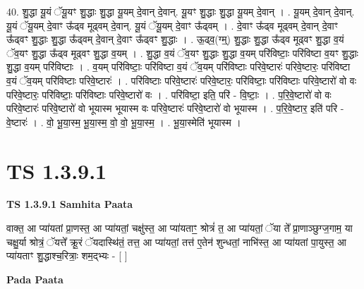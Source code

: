 \documentclass[17pt]{extarticle}
\begin{document}
40. शु॒द्धा यू॒यं ॅयू॒यꣳ शु॒द्धाः शु॒द्धा यू॒यम् दे॒वान् दे॒वान्. यू॒यꣳ शु॒द्धाः शु॒द्धा यू॒यम् दे॒वान् । . यू॒यम् दे॒वान् दे॒वान्. यू॒यं ॅयू॒यम् दे॒वाꣳ ऊ᳚ढ्व मूढ्वम् दे॒वान्. यू॒यं ॅयू॒यम् दे॒वाꣳ ऊ᳚ढ्वम् । . दे॒वाꣳ ऊ᳚ढ्व मूढ्वम् दे॒वान् दे॒वाꣳ ऊ᳚ढ्वꣳ शु॒द्धाः शु॒द्धा ऊ᳚ढ्वम् दे॒वान् दे॒वाꣳ ऊ᳚ढ्वꣳ शु॒द्धाः । . ऊ॒ढ्व॒(ग्म्॒) शु॒द्धाः शु॒द्धा ऊ᳚ढ्व मूढ्वꣳ शु॒द्धा व॒यं ॅव॒यꣳ शु॒द्धा ऊ᳚ढ्व मूढ्वꣳ शु॒द्धा व॒यम् । . शु॒द्धा व॒यं ॅव॒यꣳ शु॒द्धाः शु॒द्धा व॒यम् परि॑विष्टाः॒ परि॑विष्टा व॒यꣳ शु॒द्धाः शु॒द्धा व॒यम् परि॑विष्टाः । . व॒यम् परि॑विष्टाः॒ परि॑विष्टा व॒यं ॅव॒यम् परि॑विष्टाः परिवे॒ष्टारः॑ परिवे॒ष्टारः॒ परि॑विष्टा व॒यं ॅव॒यम् परि॑विष्टाः परिवे॒ष्टारः॑ । . परि॑विष्टाः परिवे॒ष्टारः॑ परिवे॒ष्टारः॒ परि॑विष्टाः॒ परि॑विष्टाः परिवे॒ष्टारो॑ वो वः परिवे॒ष्टारः॒ परि॑विष्टाः॒ परि॑विष्टाः परिवे॒ष्टारो॑ वः । . परि॑विष्टा॒ इति॒ परि॑ - वि॒ष्टाः॒ । . प॒रि॒वे॒ष्टारो॑ वो वः परिवे॒ष्टारः॑ परिवे॒ष्टारो॑ वो भूयास्म भूयास्म वः परिवे॒ष्टारः॑ परिवे॒ष्टारो॑ वो भूयास्म । . प॒रि॒वे॒ष्टार॒ इति॑ परि - वे॒ष्टारः॑ । . वो॒ भू॒या॒स्म॒ भू॒या॒स्म॒ वो॒ वो॒ भू॒या॒स्म॒ । . भू॒या॒स्मेति॑ भूयास्म । \newline
\pagebreak
{}

\section{ TS 1.3.9.1 }

\textbf{TS 1.3.9.1 } \newline
\textbf{Samhita Paata} \newline

वाक्त॒ आ प्या॑यतां प्रा॒णस्त॒ आ प्या॑यतां॒ चक्षु॑स्त॒ आ प्या॑यताꣳ॒॒ श्रोत्रं॑ त॒ आ प्या॑यतां॒ ॅया ते᳚ प्रा॒णाञ्छुग्ज॒गाम॒ या चक्षु॒र्या श्रोत्रं॒ ॅयत्ते᳚ क्रू॒रं ॅयदास्थि॑तं॒ तत्त॒ आ प्या॑यतां॒ तत्त॑ ए॒तेन॑ शुन्धतां॒ नाभि॑स्त॒ आ प्या॑यतां पा॒युस्त॒ आ प्या॑यताꣳ शु॒द्धाश्च॒रित्राः॒ शम॒द्भ्यः - [ ] \newline

\textbf{Pada Paata} \newline
\end{document}
